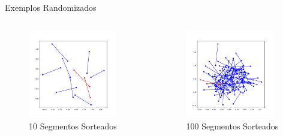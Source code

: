 \documentclass[aspectratio=169,usenames,dvipsnames]{beamer}
\begin{document}
\begin{frame}{Exemplos Randomizados}
  \begin{columns}
    \begin{column}{0.5\textwidth}
      \begin{figure}
        \includegraphics[width=0.9\textwidth]{figs/examples_0.pdf}
        \caption{10 Segmentos Sorteados}
      \end{figure}
    \end{column}
    \begin{column}{0.5\textwidth}
      \begin{figure}
        \includegraphics[width=0.9\textwidth]{figs/examples_1.pdf}
        \caption{100 Segmentos Sorteados}
      \end{figure}
    \end{column}
  \end{columns}
\end{frame}
\end{document}
